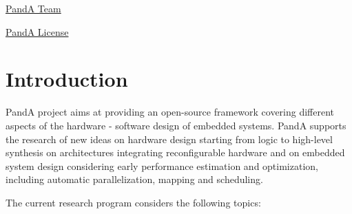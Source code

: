 \hyperlink{panda_authors}{PandA Team}

\hyperlink{panda_license}{PandA License}\hypertarget{PandA_DOC_intro}{}\section{Introduction}\label{PandA_DOC_intro}
PandA project aims at providing an open-\/source framework covering different aspects of the hardware -\/ software design of embedded systems. PandA supports the research of new ideas on hardware design starting from logic to high-\/level synthesis on architectures integrating reconfigurable hardware and on embedded system design considering early performance estimation and optimization, including automatic parallelization, mapping and scheduling.

The current research program considers the following topics\+:


